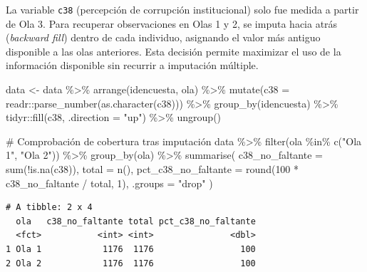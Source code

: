 \documentclass[
  spanish,
  a4paper,
  oneside]{scrbook}
\newenvironment{Shaded}{\begin{snugshade}}{\end{snugshade}}
\newcommand{\AttributeTok}[1]{\textcolor[rgb]{0.40,0.45,0.13}{#1}}
\newcommand{\CommentTok}[1]{\textcolor[rgb]{0.37,0.37,0.37}{#1}}
\newcommand{\DecValTok}[1]{\textcolor[rgb]{0.68,0.00,0.00}{#1}}
\newcommand{\FunctionTok}[1]{\textcolor[rgb]{0.28,0.35,0.67}{#1}}
\newcommand{\NormalTok}[1]{\textcolor[rgb]{0.00,0.23,0.31}{#1}}
\newcommand{\OtherTok}[1]{\textcolor[rgb]{0.00,0.23,0.31}{#1}}
\newcommand{\SpecialCharTok}[1]{\textcolor[rgb]{0.37,0.37,0.37}{#1}}
\newcommand{\StringTok}[1]{\textcolor[rgb]{0.13,0.47,0.30}{#1}}
\begin{document}
La variable \texttt{c38} (percepción de corrupción institucional) solo
fue medida a partir de Ola 3. Para recuperar observaciones en Olas 1 y
2, se imputa hacia atrás (\emph{backward fill}) dentro de cada
individuo, asignando el valor más antiguo disponible a las olas
anteriores. Esta decisión permite maximizar el uso de la información
disponible sin recurrir a imputación múltiple.

\begin{Shaded}
\begin{Highlighting}[]
\NormalTok{data }\OtherTok{\textless{}{-}}\NormalTok{ data }\SpecialCharTok{\%\textgreater{}\%}
  \FunctionTok{arrange}\NormalTok{(idencuesta, ola) }\SpecialCharTok{\%\textgreater{}\%}
  \FunctionTok{mutate}\NormalTok{(}\AttributeTok{c38 =}\NormalTok{ readr}\SpecialCharTok{::}\FunctionTok{parse\_number}\NormalTok{(}\FunctionTok{as.character}\NormalTok{(c38))) }\SpecialCharTok{\%\textgreater{}\%}
  \FunctionTok{group\_by}\NormalTok{(idencuesta) }\SpecialCharTok{\%\textgreater{}\%}
\NormalTok{  tidyr}\SpecialCharTok{::}\FunctionTok{fill}\NormalTok{(c38, }\AttributeTok{.direction =} \StringTok{"up"}\NormalTok{) }\SpecialCharTok{\%\textgreater{}\%}
  \FunctionTok{ungroup}\NormalTok{()}

\CommentTok{\# Comprobación de cobertura tras imputación}
\NormalTok{data }\SpecialCharTok{\%\textgreater{}\%}
  \FunctionTok{filter}\NormalTok{(ola }\SpecialCharTok{\%in\%} \FunctionTok{c}\NormalTok{(}\StringTok{"Ola 1"}\NormalTok{, }\StringTok{"Ola 2"}\NormalTok{)) }\SpecialCharTok{\%\textgreater{}\%}
  \FunctionTok{group\_by}\NormalTok{(ola) }\SpecialCharTok{\%\textgreater{}\%}
  \FunctionTok{summarise}\NormalTok{(}
    \AttributeTok{c38\_no\_faltante =} \FunctionTok{sum}\NormalTok{(}\SpecialCharTok{!}\FunctionTok{is.na}\NormalTok{(c38)),}
    \AttributeTok{total =} \FunctionTok{n}\NormalTok{(),}
    \AttributeTok{pct\_c38\_no\_faltante =} \FunctionTok{round}\NormalTok{(}\DecValTok{100} \SpecialCharTok{*}\NormalTok{ c38\_no\_faltante }\SpecialCharTok{/}\NormalTok{ total, }\DecValTok{1}\NormalTok{),}
    \AttributeTok{.groups =} \StringTok{"drop"}
\NormalTok{  )}
\end{Highlighting}
\end{Shaded}

\begin{verbatim}
# A tibble: 2 x 4
  ola   c38_no_faltante total pct_c38_no_faltante
  <fct>           <int> <int>               <dbl>
1 Ola 1            1176  1176                 100
2 Ola 2            1176  1176                 100
\end{verbatim}
\end{document}
